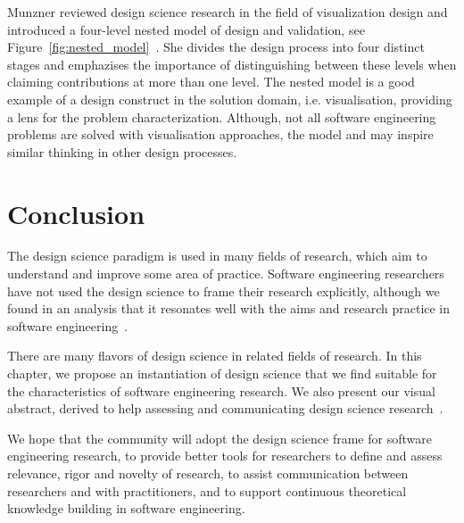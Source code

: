 \documentclass[graybox]{svmult}
\newcommand{\per}[1]{\textcolor{cyan}{{\it [Per says: #1]}}}
\newcommand{\per}[1]{}
\begin{document}
Munzner reviewed design science research in the field of visualization design and introduced a four-level nested model of design and validation, see Figure~\ref{fig:nested_model}~\cite{munzner2009}. She divides the design process into four distinct stages and emphazises the importance of distinguishing between these levels when claiming contributions at more than one level. The nested model is a good example of a design construct in the solution domain, i.e. visualisation, providing a lens for the problem characterization. Although, not all software engineering problems are solved with visualisation approaches, the model and may inspire similar thinking in other design processes. 







\section{Conclusion}
\label{sec:conclusion}
The design science paradigm is used in many fields of research, which aim to understand and improve some area of practice. Software engineering researchers have not used the design science to frame their research explicitly, although we found in an analysis that it resonates well with the aims and research practice in software engineering~\cite{Engstrom19arxiv}. 

There are many flavors of design science in related fields of research. In this chapter, we propose an instantiation of design science that we find suitable for the characteristics of software engineering research. We also present our visual abstract, derived to help assessing and communicating design science research~\cite{StoreyESEM17}. 

We hope that the community will adopt the design science frame for software engineering research, to provide better tools for researchers to define and assess relevance, rigor and novelty of research, to assist communication between researchers and with practitioners, and to support continuous theoretical knowledge building in software engineering. 




\end{document}
